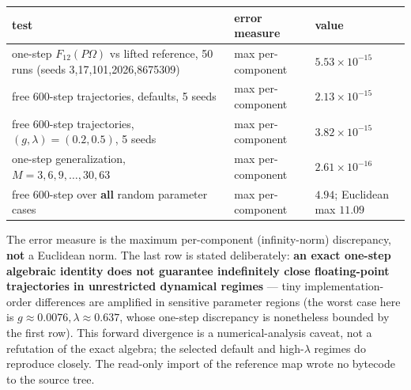 \documentclass[
  11pt,
  a4paper,
]{article}
\newcounter{none} %
\begin{document}
{\def\LTcaptype{none} %
\begin{longtable}[]{@{}
  >{\raggedright\arraybackslash}p{}
  >{\raggedright\arraybackslash}p{}
  >{\raggedright\arraybackslash}p{}@{}}
\toprule\noalign{}
\begin{minipage}[b]{\linewidth}\raggedright
test
\end{minipage} & \begin{minipage}[b]{\linewidth}\raggedright
error measure
\end{minipage} & \begin{minipage}[b]{\linewidth}\raggedright
value
\end{minipage} \\
\midrule\noalign{}
\endhead
\bottomrule\noalign{}
\endlastfoot
one-step \(F_{12}(P\Omega)\) vs lifted reference, 50 runs (seeds 3,17,101,2026,8675309) & max per-component & \(5.53\times10^{-15}\) \\
free 600-step trajectories, defaults, 5 seeds & max per-component & \(2.13\times10^{-15}\) \\
free 600-step trajectories, \((g,\lambda)=(0.2,0.5)\), 5 seeds & max per-component & \(3.82\times10^{-15}\) \\
one-step generalization, \(M=3,6,9,\dots,30,63\) & max per-component & \(2.61\times10^{-16}\) \\
free 600-step over \textbf{all} random parameter cases & max per-component & \(4.94\); Euclidean max \(11.09\) \\
\end{longtable}
}

\endgroup

The error measure is the maximum per-component (infinity-norm) discrepancy, \textbf{not} a Euclidean norm. The last row is stated deliberately: \textbf{an exact one-step algebraic identity does not guarantee indefinitely close floating-point trajectories in unrestricted dynamical regimes} --- tiny implementation-order differences are amplified in sensitive parameter regions (the worst case here is \(g\approx0.0076,\lambda\approx0.637\), whose one-step discrepancy is nonetheless bounded by the first row). This forward divergence is a numerical-analysis caveat, not a refutation of the exact algebra; the selected default and high-\(\lambda\) regimes do reproduce closely. The read-only import of the reference map wrote no bytecode to the source tree.
\end{document}
